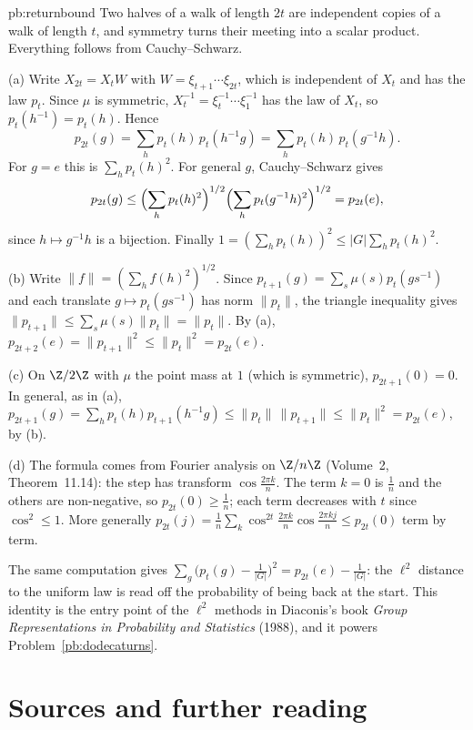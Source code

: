 \begin{solution}{pb:returnbound}
\idea Two halves of a walk of length $2t$ are independent copies of a walk of length $t$, and symmetry turns their meeting into a scalar
product. Everything follows from Cauchy--Schwarz.

\writeup (a) Write $X_{2t}=X_tW$ with $W=\xi_{t+1}\cdots\xi_{2t}$, which is independent of $X_t$ and has the law $p_t$. Since $\mu$ is symmetric,
$X_t^{-1}=\xi_t^{-1}\cdots\xi_1^{-1}$ has the law of $X_t$, so $p_t(h^{-1})=p_t(h)$. Hence
\[
p_{2t}(g)=\sum_hp_t(h)\,p_t(h^{-1}g)=\sum_hp_t(h)\,p_t(g^{-1}h).
\]
For $g=e$ this is $\sum_hp_t(h)^2$. For general $g$, Cauchy--Schwarz gives
\[
p_{2t}(g)\le\Bigl(\sum_hp_t(h)^2\Bigr)^{1/2}\Bigl(\sum_hp_t(g^{-1}h)^2\Bigr)^{1/2}=p_{2t}(e),
\]
since $h\mapsto g^{-1}h$ is a bijection. Finally $1=(\sum_hp_t(h))^2\le|G|\sum_hp_t(h)^2$.

(b) Write $\|f\|=(\sum_hf(h)^2)^{1/2}$. Since $p_{t+1}(g)=\sum_s\mu(s)p_t(gs^{-1})$ and each translate $g\mapsto p_t(gs^{-1})$ has norm $\|p_t\|$, the triangle inequality gives
$\|p_{t+1}\|\le\sum_s\mu(s)\|p_t\|=\|p_t\|$. By (a), $p_{2t+2}(e)=\|p_{t+1}\|^2\le\|p_t\|^2=p_{2t}(e)$.

(c) On $\Z/2\Z$ with $\mu$ the point mass at $1$ (which is symmetric), $p_{2t+1}(0)=0$. In general, as in (a),
$p_{2t+1}(g)=\sum_hp_t(h)p_{t+1}(h^{-1}g)\le\|p_t\|\,\|p_{t+1}\|\le\|p_t\|^2=p_{2t}(e)$, by (b).

(d) The formula comes from Fourier analysis on $\Z/n\Z$ (Volume~2, Theorem~11.14): the step has transform $\cos\frac{2\pi k}n$. The term $k=0$ is $\frac1n$ and the
others are non-negative, so $p_{2t}(0)\ge\frac1n$; each term decreases with $t$ since $\cos^2\le1$. More generally
$p_{2t}(j)=\frac1n\sum_k\cos^{2t}\frac{2\pi k}n\cos\frac{2\pi kj}n\le p_{2t}(0)$ term by term.

\leads The same computation gives $\sum_g\bigl(p_t(g)-\frac1{|G|}\bigr)^2=p_{2t}(e)-\frac1{|G|}$: the $\ell^2$ distance to the uniform law is read off the
probability of being back at the start. This identity is the entry point of the $\ell^2$ methods in Diaconis's book \emph{Group
Representations in Probability and Statistics} (1988), and it powers Problem~\ref{pb:dodecaturns}.
\end{solution}

\section*{Sources and further reading}


